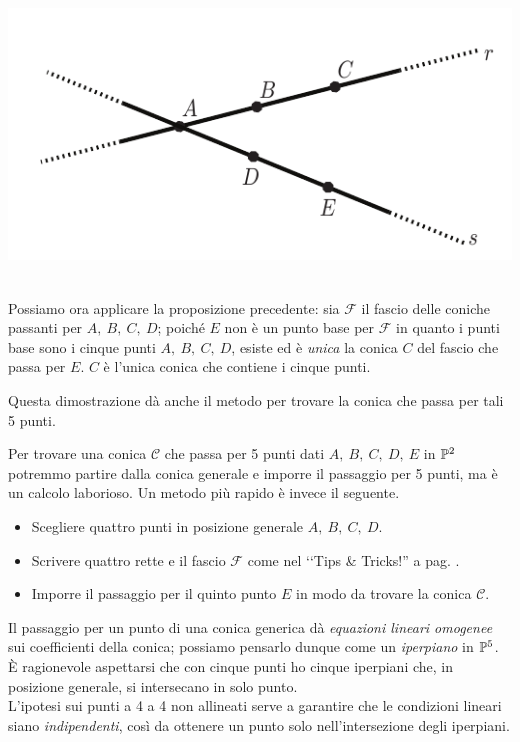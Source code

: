 \begin{demonstration}
	\begin{minipage}{0.30\textwidth}
		\includegraphics[trim=0cm 0cm 0cm 0cm,clip,scale=0.50]{images/fivepointconic2.pdf}
	\end{minipage}\\
	Possiamo ora applicare la proposizione precedente: sia $\mathcal{F}$ il fascio delle coniche passanti per $A,\ B,\ C,\ D$; poiché $E$ non è un punto base per $\mathcal{F}$ in quanto i punti base sono i cinque punti $A,\ B,\ C,\ D$, esiste ed è \textit{unica} la conica $C$ del fascio che passa per $E$. $C$ è l'unica conica che contiene i cinque punti.
\end{demonstration}
Questa dimostrazione dà anche il metodo per trovare la conica che passa per tali 5 punti.
\begin{tips}
	Per trovare una conica $\mathcal{C}$ che passa per 5 punti dati $A,\ B,\ C,\ D,\ E$ in $\proj[2]{\ }$ potremmo partire dalla conica generale e imporre il passaggio per 5 punti, ma è un calcolo laborioso. Un metodo più rapido è invece il seguente.
		\begin{itemize}
			\item	Scegliere quattro punti in posizione generale $A,\ B,\ C,\ D$.
			\item	Scrivere quattro rette e il fascio $\mathcal{F} $ come nel ‘‘Tips \& Tricks!'' a pag. \pageref{fascio coniche per 4 pt pos gen}.
			\item	Imporre il passaggio per il quinto punto $E$ in modo da trovare la conica $\mathcal{C}$.
		\end{itemize}
	\vspace{-3mm}
\end{tips}
\begin{observe}
	Il passaggio per un punto di una conica generica dà \textit{equazioni lineari omogenee} sui coefficienti della conica; possiamo pensarlo dunque come un \textit{iperpiano} in $\proj[5]{\ }$. È ragionevole aspettarsi che con cinque punti ho cinque iperpiani che, in posizione generale, si intersecano in solo punto.\\
	L'ipotesi sui punti a 4 a 4 non allineati serve a garantire che le condizioni lineari siano \textit{indipendenti}, così da ottenere un punto solo nell'intersezione degli iperpiani.
\end{observe}
